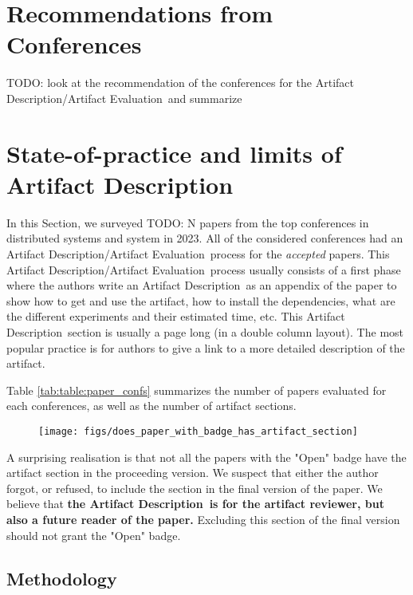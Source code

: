 \documentclass[sigconf]{acmart}
\newcommand{\ad}{Artifact Description}
\newcommand{\aeval}{Artifact Evaluation}
\newcommand{\adae}{\ad/\aeval}
\newcommand{\todo}[1]{{\color{red}TODO: #1}}
\begin{document}
%
\section{Recommendations from Conferences}

\todo{look at the recommendation of the conferences for the \adae\ and summarize}

%
\section{State-of-practice and limits of \ad}\label{sec:sop}



In this Section, we surveyed \todo{N} papers from the top conferences in distributed systems and system in 2023.
All of the considered conferences had an \adae\ process for the \emph{accepted} papers.
This \adae\ process usually consists of a first phase where the authors write an \ad\ as an appendix of the paper to show how to get and use the artifact, how to install the dependencies, what are the different experiments and their estimated time, etc.
This \ad\ section is usually a page long (in a double column layout).
The most popular practice is for authors to give a link to a more detailed description of the artifact.

Table \ref{tab:table:paper_confs} summarizes the number of papers evaluated for each conferences, as well as the number of artifact sections.


\begin{figure}
  \centering
  \texttt{[image: figs/does\_paper\_with\_badge\_has\_artifact\_section]}
  \caption{}\label{fig:}
\end{figure}

A surprising realisation is that not all the papers with the "Open" badge have the artifact section in the proceeding version.
We suspect that either the author forgot, or refused, to include the section in the final version of the paper.
We believe that \textbf{the \ad\ is for the artifact reviewer, but also a future reader of the paper.}
Excluding this section of the final version should not grant the "Open" badge.

\subsection{Methodology}
\end{document}
